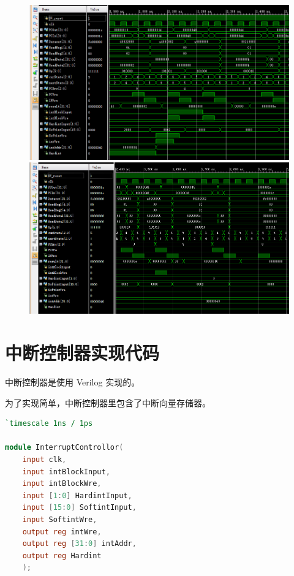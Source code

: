 \documentclass{article}
\begin{document}
\begin{appendices}
\begin{figure}[!h]
\centering
\includegraphics[scale=0.49]{../pics/img_5.png}
\includegraphics[scale=0.47]{../pics/img_6.png}
\end{figure}

\newpage

\section{中断控制器实现代码}

中断控制器是使用 Verilog 实现的。

为了实现简单，中断控制器里包含了中断向量存储器。

\begin{lstlisting}[language=verilog]
`timescale 1ns / 1ps

module InterruptControllor(
    input clk,
    input intBlockInput,
    input intBlockWre,
    input [1:0] HardintInput,
    input [15:0] SoftintInput,
    input SoftintWre,
    output reg intWre,
    output reg [31:0] intAddr,
    output reg Hardint
    );
    

\end{lstlisting}
\end{appendices}
\end{document}
